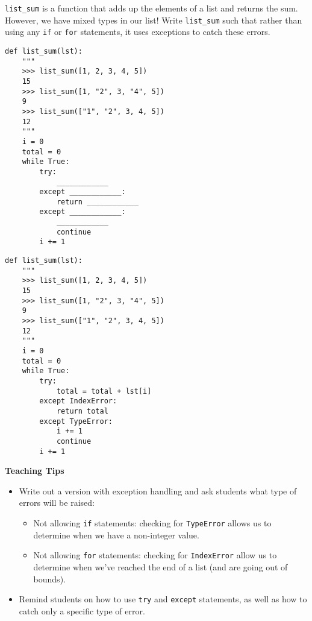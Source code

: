 \begin{blocksection}
\question \lstinline{list_sum} is a function that adds up the elements of a list and returns the sum. However, we have mixed types in our list! Write \lstinline{list_sum} such that rather than using any \lstinline{if} or \lstinline{for} statements, it uses exceptions to catch these errors.

\end{blocksection}

\ifprintanswers\else
\begin{lstlisting}
def list_sum(lst):
    """
    >>> list_sum([1, 2, 3, 4, 5])
    15
    >>> list_sum([1, "2", 3, "4", 5])
    9
    >>> list_sum(["1", "2", 3, 4, 5])
    12
    """
    i = 0
    total = 0
    while True:
        try:
            ____________
        except ____________:
            return ____________
        except ____________:
            ____________
            continue
        i += 1
\end{lstlisting}
\fi

\begin{solution}
\begin{blocksection}
\begin{lstlisting}
def list_sum(lst):
    """
    >>> list_sum([1, 2, 3, 4, 5])
    15
    >>> list_sum([1, "2", 3, "4", 5])
    9
    >>> list_sum(["1", "2", 3, 4, 5])
    12
    """
    i = 0
    total = 0
    while True:
        try:
            total = total + lst[i]
        except IndexError:
            return total
        except TypeError:
            i += 1
            continue
        i += 1
\end{lstlisting}
\end{blocksection}
\end{solution}

\begin{guide}
\begin{blocksection}
\textbf{Teaching Tips}
\begin{itemize}
    \item Write out a version with exception handling and ask students what type of errors will be raised:
    \begin{itemize}
        \item Not allowing \lstinline{if} statements: checking for \lstinline{TypeError} allows us to determine when we have a non-integer value.
        \item Not allowing \lstinline{for} statements: checking for \lstinline{IndexError} allow us to determine when we've reached the end of a list (and are going out of bounds). 
    \end{itemize}
    \item Remind students on how to use \lstinline{try} and \lstinline{except} statements, as well as how to catch only a specific type of error. 
    
\end{itemize}
\end{blocksection}
\end{guide}